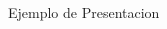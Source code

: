 \documentclass[12pt]{beamer}
\begin{document}
    \begin{frame}{Ejemplo de Presentacion}
       \begin{columns}
           \begin{column}{0.5 \textwidth}
           \end{column}
           \begin{column}{0.5 \textwidth}
           \end{column}
       \end{columns}
    \end{frame}
\end{document}
